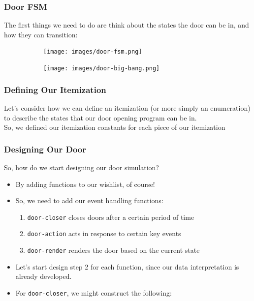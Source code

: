\documentclass{beamer}
\begin{document}
\begin{frame}
  \frametitle{Door FSM}
  The first things we need to do are think about the states the door can be in, and how they can transition:
  \pause
  \begin{figure}
    \begin{subfigure}[b]{0.2\textwidth}
      \texttt{[image: images/door-fsm.png]}
    \end{subfigure}
    \pause
    \begin{subfigure}[b]{0.2\textwidth}
      \texttt{[image: images/door-big-bang.png]}
    \end{subfigure}
  \end{figure}
\end{frame}
   
\begin{frame}
  \frametitle{Defining Our Itemization}
  Let's consider how we can define an itemization (or more simply an enumeration) to describe the states that our door opening program can be in.\\
  \pause
  \lockItemization
  So, we defined our itemization constants for each piece of our itemization
\end{frame}


\begin{frame}
  \frametitle{Designing Our Door}
  So, how do we start designing our door simulation?
  \begin{itemize}
  \item<2-> By adding functions to our wishlist, of course!
  \item<3-> So, we need to add our event handling functions:    
    \begin{enumerate}
    \item<4-> \texttt{door-closer} closes doors after a certain period of time
    \item<5-> \texttt{door-action} acts in response to certain key events
    \item<6-> \texttt{door-render} renders the door based on the current state
    \end{enumerate}
  \item<7-> Let's start design step 2 for each function, since our data interpretation is already developed.
  \item<8-> For \texttt{door-closer}, we might construct the following:
    \doorCloseStub
  \end{itemize}
\end{frame}
\end{document}
